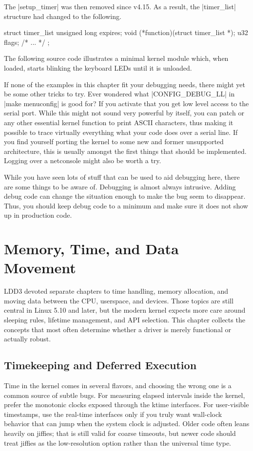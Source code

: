 \documentclass[10pt, oneside]{book}
\begin{document}
The \cpp|setup_timer| was then removed since v4.15.
As a result, the \cpp|timer_list| structure had changed to the following.
\begin{code}
struct timer_list {
    unsigned long expires;
    void (*function)(struct timer_list *);
    u32 flags;
    /* ... */
};
\end{code}

The following source code illustrates a minimal kernel module which, when loaded, starts blinking the keyboard LEDs until it is unloaded.


If none of the examples in this chapter fit your debugging needs, there might yet be some other tricks to try.
Ever wondered what \cpp|CONFIG_DEBUG_LL| in \sh|make menuconfig| is good for?
If you activate that you get low level access to the serial port.
While this might not sound very powerful by itself, you can patch  or any other essential kernel function to print ASCII characters, thus making it possible to trace virtually everything what your code does over a serial line.
If you find yourself porting the kernel to some new and former unsupported architecture, this is usually amongst the first things that should be implemented.
Logging over a netconsole might also be worth a try.

While you have seen lots of stuff that can be used to aid debugging here, there are some things to be aware of. Debugging is almost always intrusive.
Adding debug code can change the situation enough to make the bug seem to disappear.
Thus, you should keep debug code to a minimum and make sure it does not show up in production code.

\chapter{Memory, Time, and Data Movement}
LDD3 devoted separate chapters to time handling, memory allocation, and moving
data between the CPU, userspace, and devices.
Those topics are still central in Linux 5.10 and later, but the modern kernel expects more
care around sleeping rules, lifetime management, and API selection.
This chapter collects the concepts that most often determine whether a driver is
merely functional or actually robust.

\section{Timekeeping and Deferred Execution}
\label{sec:timekeeping}
Time in the kernel comes in several flavors, and choosing the wrong one is a
common source of subtle bugs.
For measuring elapsed intervals inside the kernel, prefer the monotonic clocks
exposed through the ktime interfaces.
For user-visible timestamps, use the real-time interfaces only if you truly want
wall-clock behavior that can jump when the system clock is adjusted.
Older code often leans heavily on jiffies; that is still valid for coarse
timeouts, but newer code should treat jiffies as the low-resolution option
rather than the universal time type.
\end{document}
